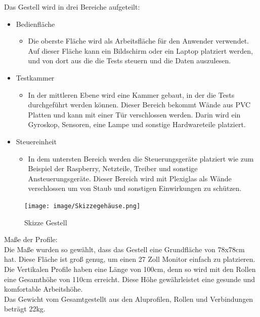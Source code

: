 Das Gestell wird in drei Bereiche aufgeteilt:\\
\begin{itemize}
    \item Bedienfläche
    \begin{itemize}
        \item Die oberste Fläche wird als Arbeitsfläche für den Anwender verwendet. Auf dieser Fläche kann ein Bildschirm oder ein Laptop platziert werden, und von dort aus die  die Tests steuern und die Daten auszulesen.
    \end{itemize}
    \item Testkammer
    \begin{itemize}
        \item In der mittleren Ebene wird eine Kammer gebaut, in der die Tests durchgeführt werden können. Dieser Bereich bekommt Wände aus PVC Platten und kann mit einer Tür verschlossen werden. Darin wird ein Gyroskop, Sensoren, eine Lampe und sonstige Hardwareteile platziert.
    \end{itemize}
    \item Steuereinheit
    \begin{itemize}
        \item In dem untersten Bereich werden die Steuerungsgeräte platziert wie zum Beispiel der Raspberry, Netzteile, Treiber und sonstige Ansteuerungsgeräte. Dieser Bereich wird mit Plexiglas als Wände verschlossen um von Staub und sonstigen Einwirkungen zu schützen. 
    \end{itemize}
\end{itemize}
\begin{figure}[H]
    \centering
    \texttt{[image: image/Skizzegehäuse.png]}
    \caption{Skizze Gestell}
    \label{fig:enter-label}
\end{figure}
\pagebreak
Maße der Profile:\\
\vspace{3mm}
Die Maße wurden so gewählt, dass das Gestell eine Grundfläche von 78x78cm hat. Diese Fläche ist groß genug, um einen 27 Zoll Monitor einfach zu platzieren. Die Vertikalen Profile haben eine Länge von 100cm, denn so wird mit den Rollen eine Gesamthöhe von 110cm erreicht. Diese Höhe gewährleistet eine gesunde und komfortable Arbeitshöhe.\\                                       \vspace{3mm}  
Das Gewicht vom Gesamtgestellt aus den Aluprofilen, Rollen und Verbindungen beträgt 22kg.\\
\vspace{3mm}

